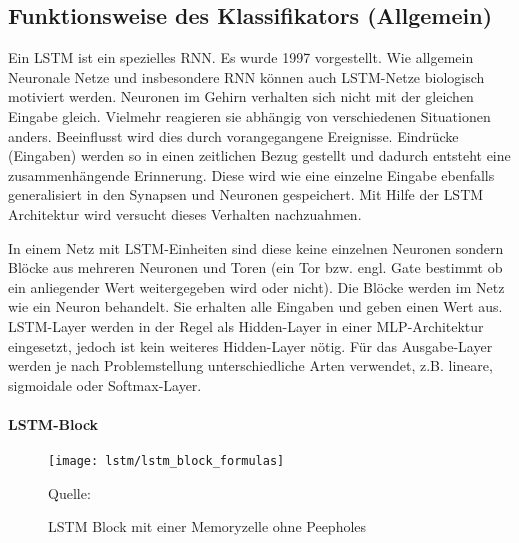 \subsection{Funktionsweise des Klassifikators (Allgemein)}
\label{sec:lstm_allg}
Ein \acl{LSTM} ist ein spezielles \ac{RNN}. Es wurde 1997
vorgestellt\cite{Hochreiter:1997}. Wie allgemein Neuronale Netze und
insbesondere \ac{RNN} können auch \ac{LSTM}-Netze biologisch motiviert werden.
Neuronen im Gehirn verhalten sich nicht mit der gleichen Eingabe gleich.
Vielmehr reagieren sie abhängig von verschiedenen Situationen anders. Beeinflusst
wird dies durch vorangegangene Ereignisse. Eindrücke (Eingaben) werden so in
einen zeitlichen Bezug gestellt und dadurch entsteht eine zusammenhängende
Erinnerung. Diese wird wie eine einzelne Eingabe ebenfalls generalisiert in den
Synapsen und Neuronen gespeichert. Mit Hilfe der \ac{LSTM} Architektur wird
versucht dieses Verhalten nachzuahmen.

In einem Netz mit \ac{LSTM}-Einheiten sind diese keine einzelnen Neuronen
sondern Blöcke aus mehreren Neuronen und Toren (ein Tor bzw. engl.
Gate bestimmt ob ein anliegender Wert weitergegeben wird oder nicht).
Die Blöcke werden im Netz wie ein Neuron behandelt. Sie erhalten alle Eingaben
und geben einen Wert aus. \ac{LSTM}-Layer werden in der Regel als Hidden-Layer
in einer \ac{MLP}-Architektur eingesetzt, jedoch ist kein weiteres Hidden-Layer
nötig. Für das Ausgabe-Layer werden je nach Problemstellung unterschiedliche
Arten verwendet, z.B. lineare, sigmoidale oder Softmax-Layer.

\paragraph{\ac{LSTM}-Block}

\begin{figure*}[htfp]
	\begin{center}
	\texttt{[image: lstm/lstm\_block\_formulas]}
	\caption[\acs{LSTM} Block]{\acs{LSTM} Block mit einer Memoryzelle ohne
	Peepholes} \tiny Quelle: \cite{Gers2002b}
	\label{fig:lstm_block}
	\end{center}
\end{figure*}  

